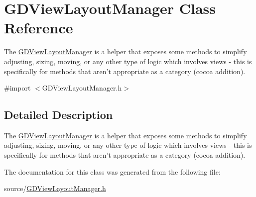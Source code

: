 \hypertarget{interface_g_d_view_layout_manager}{
\section{GDViewLayoutManager Class Reference}
\label{interface_g_d_view_layout_manager}
}


The \hyperlink{interface_g_d_view_layout_manager}{GDViewLayoutManager} is a helper that exposes some methods to simplify adjusting, sizing, moving, or any other type of logic which involves views -\/ this is specifically for methods that aren't appropriate as a category (cocoa addition).  


{\ttfamily \#import $<$GDViewLayoutManager.h$>$}

\subsection{Detailed Description}
The \hyperlink{interface_g_d_view_layout_manager}{GDViewLayoutManager} is a helper that exposes some methods to simplify adjusting, sizing, moving, or any other type of logic which involves views -\/ this is specifically for methods that aren't appropriate as a category (cocoa addition). 

The documentation for this class was generated from the following file:\begin{DoxyCompactItemize}
\item 
source/\hyperlink{_g_d_view_layout_manager_8h}{GDViewLayoutManager.h}\end{DoxyCompactItemize}
